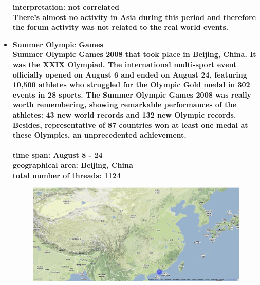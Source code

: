 \documentclass[11pt,a4paper,english]{article}
\begin{document}
\begin{itemize}
\begin{figure}[H]
\begin{center}
							\end{center}
							\vspace{-5pt}
						\end{figure}						
						\bf interpretation: \rm not correlated
						\\ There's almost no activity in Asia during this period and therefore the forum activity was not related to the real world events.
						
						

					\item \bf Summer Olympic Games \rm
						\\ Summer Olympic Games 2008 that took place in Beijing, China. It was the XXIX Olympiad. The international multi-sport event officially opened on August 6 and ended on August 24, featuring 10,500 athletes who struggled for the Olympic Gold medal in 302 events in 28 sports. The Summer Olympic Games 2008 was really worth remembering, showing remarkable performances of the athletes: 43 new world records and 132 new Olympic records. Besides, representative of 87 countries won at least one medal at these Olympics, an unprecedented achievement.
						\\\\ \bf time span: \rm August 8 - 24
						\\ \bf geographical area: \rm Beijing, China
						\\ \bf total number of threads: \rm 1124
						\begin{figure}[H]
							\vspace{-5pt}
  							\begin{center}
								\includegraphics[width=130mm]{img/pre-olympic}
							\end{center}
							\vspace{-13pt}
						\end{figure}
						\begin{figure}[H]
							\vspace{-13pt}

\end{figure}
\end{itemize}
\end{document}
